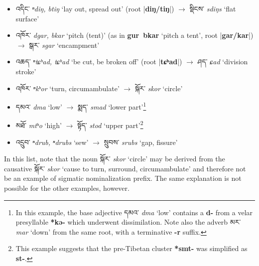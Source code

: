 \documentclass[oneside,a4paper,11pt]{article}
\newcommand{\ipa}[1]{\textbf{{\phon\mbox{#1}}}} %
\newcommand{\tibet}[3]{{\tibetain#1} \textit{\phon#2} `#3'}
\newcommand{\dhat}[1]{|\ipa{#1}|}
\begin{document}
\begin{itemize}
\item \tibet{འདིང་}{ⁿdiŋ, btiŋ}{lay out, spread out} (root \dhat{diŋ/tiŋ}) $\rightarrow$	\tibet{སྡིངས་}{sdiŋs}{flat surface} 
\item \tibet{འཁོར་}{dgar, bkar}{pitch (tent)} (as in \ipa{gur bkar} `pitch a tent', root \dhat{gar/kar}) $\rightarrow$	\tibet{སྒར་}{sgar}{encampment} 
\item \tibet{འཆད་}{ⁿtɕʰad, tɕʰad}{be cut, be broken off} (root \dhat{tɕʰad}) $\rightarrow$	\tibet{ཤད་}{ɕad}{division stroke} 
\item \tibet{འཁོར་}{ⁿkʰor}{turn, circumambulate} $\rightarrow$	\tibet{སྐོར་}{skor}{circle} 
\item \tibet{དམའ་}{dma}{low} $\rightarrow$	\tibet{སྨད་}{smad}{lower part}\footnote{In this example, the base adjective \tibet{དམའ་}{dma}{low} contains a \ipa{d-} from a velar presyllable \ipa{*kə-} which underwent dissimilation. Note also the adverb \tibet{མར་}{mar}{down} from the same root, with a terminative \ipa{-r} suffix. }
\item \tibet{མཐོ་}{mtʰo}{high} $\rightarrow$	\tibet{སྟོད་}{stod}{upper part}\footnote{This example suggests that the pre-Tibetan cluster \ipa{*smt-} was simplified as \ipa{st-}. }
\item  \tibet{འདྲུབ་}{ⁿdrub, ⁿdrubs}{sew} $\rightarrow$ \tibet{སྲུབས་}{srubs}{gap, fissure} 
\end{itemize}
 
In this list, note that the noun \tibet{སྐོར་}{skor}{circle} may be derived from the causative \tibet{སྐོར་}{skor}{cause to turn, surround, circumambulate} and therefore not be an example of sigmatic nominalization prefix. The same explanation is not possible for the other examples, however. 
\end{document}

